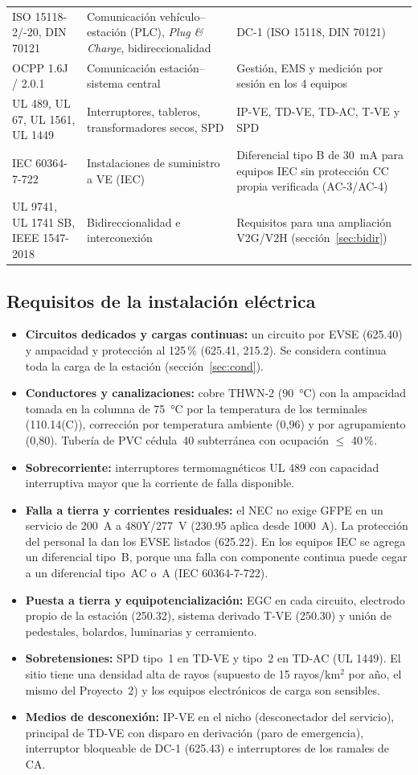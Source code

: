 {\begin{longtable}{L{3.6cm}L{5.0cm}L{6.4cm}}
ISO 15118-2/-20, DIN 70121 & Comunicación vehículo--estación (PLC), \emph{Plug \& Charge}, bidireccionalidad & DC-1 (ISO 15118, DIN 70121)\\
OCPP 1.6J / 2.0.1 & Comunicación estación--sistema central & Gestión, EMS y medición por sesión en los 4 equipos\\
UL 489, UL 67, UL 1561, UL 1449 & Interruptores, tableros, transformadores secos, SPD & IP-VE, TD-VE, TD-AC, T-VE y SPD\\
IEC 60364-7-722 & Instalaciones de suministro a VE (IEC) & Diferencial tipo B de 30~mA para equipos IEC sin protección CC propia verificada (AC-3/AC-4)\\
UL 9741, UL 1741 SB, IEEE 1547-2018 & Bidireccionalidad e interconexión & Requisitos para una ampliación V2G/V2H (sección~\ref{sec:bidir})\\
\bottomrule
\end{longtable}}

\subsection{Requisitos de la instalación eléctrica}
\label{sec:req_inst}
\begin{itemize}
\item \textbf{Circuitos dedicados y cargas continuas:} un circuito por EVSE (625.40) y ampacidad y protección al 125\,\% (625.41, 215.2). Se considera continua toda la carga de la estación (sección~\ref{sec:cond}).
\item \textbf{Conductores y canalizaciones:} cobre THWN-2 (90~°C) con la ampacidad tomada en la columna de 75~°C por la temperatura de los terminales (110.14(C)), corrección por temperatura ambiente (0,96) y por agrupamiento (0,80). Tubería de PVC cédula~40 subterránea con ocupación $\le$ 40\,\%.
\item \textbf{Sobrecorriente:} interruptores termomagnéticos UL 489 con capacidad interruptiva mayor que la corriente de falla disponible.
\item \textbf{Falla a tierra y corrientes residuales:} el NEC no exige GFPE en un servicio de 200~A a 480Y/277~V (230.95 aplica desde 1000~A). La protección del personal la dan los EVSE listados (625.22). En los equipos IEC se agrega un diferencial tipo~B, porque una falla con componente continua puede cegar a un diferencial tipo~AC o~A (IEC 60364-7-722).
\item \textbf{Puesta a tierra y equipotencialización:} EGC en cada circuito, electrodo propio de la estación (250.32), sistema derivado T-VE (250.30) y unión de pedestales, bolardos, luminarias y cerramiento.
\item \textbf{Sobretensiones:} SPD tipo~1 en TD-VE y tipo~2 en TD-AC (UL 1449). El sitio tiene una densidad alta de rayos (supuesto de 15 rayos/km$^2$ por año, el mismo del Proyecto~2) y los equipos electrónicos de carga son sensibles.
\item \textbf{Medios de desconexión:} IP-VE en el nicho (desconectador del servicio), principal de TD-VE con disparo en derivación (paro de emergencia), interruptor bloqueable de DC-1 (625.43) e interruptores de los ramales de CA.
\end{itemize}

